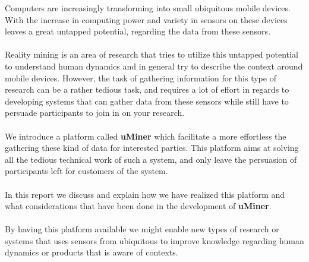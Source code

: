 
Computers are increasingly transforming into small ubiquitous mobile devices. With the increase in computing power and variety in sensors on these devices leaves a great untapped potential, regarding the data from these sensors. 
\\\\
Reality mining is an area of research that tries to utilize this untapped potential to understand human dynamics and in general try to describe the context around mobile devices. However, the task of gathering information for this type of research can be a rather tedious task, and requires a lot of effort in regards to developing systems that can gather data from these sensors while still have to persuade participants to join in on your research.
\\\\
We introduce a platform called \textbf{uMiner} which facilitate a more effortless the gathering these kind of data for interested parties. This platform aims at solving all the tedious technical work of such a system, and only leave the persuasion of participants left for customers of the system.
\\\\
In this report we discuss and explain how we have realized this platform and what considerations that have been done in the development of \textbf{uMiner}.
\\\\
By having this platform available we might enable new types of research or systems that uses sensors from ubiquitous to improve knowledge regarding human dynamics or products that is aware of contexts.